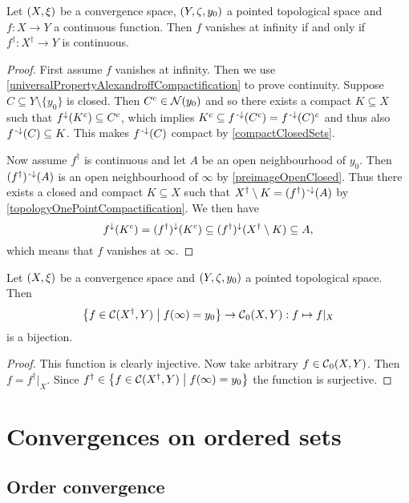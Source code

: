 \begin{proposition} \label{vanishesAtInfinityIffBasepointExtensionContinuous}
Let $\sSet{X,\xi}$ be a convergence space, $\sSet{Y,\zeta, y_0}$ a pointed topological space and $f:X\to Y$ a continuous function. Then $f$ vanishes at infinity \textup{if and only if} $f^\dagger: X^\dagger \to Y$ is continuous.
\end{proposition}
\begin{proof}
First assume $f$ vanishes at infinity. Then we use \ref{universalPropertyAlexandroffCompactification} to prove continuity. Suppose $C\subseteq Y\setminus\{y_0\}$ is closed. Then $C^c \in \operatorname{\mathcal{N}}(y_0)$ and so there exists a compact $K\subseteq X$ such that $f^\downarrow(K^c)\subseteq C^c$, which implies $K^c \subseteq f^{\text{\hspace{0.15em}-}\downarrow}(C^c) = f^{\text{\hspace{0.15em}-}\downarrow}(C)^c$ and thus also $f^{\text{\hspace{0.15em}-}\downarrow}(C)\subseteq K$. This makes $f^{\text{\hspace{0.15em}-}\downarrow}(C)$ compact by \ref{compactClosedSets}.

Now assume $f^\dagger$ is continuous and let $A$ be an open neighbourhood of $y_0$. Then $(f^\dagger)^{\text{\hspace{0.15em}-}\downarrow}(A)$ is an open neighbourhood of $\infty$ by \ref{preimageOpenClosed}. Thus there exists a closed and compact $K\subseteq X$ such that $X^\dagger\setminus K = (f^\dagger)^{\text{\hspace{0.15em}-}\downarrow}(A)$ by \ref{topologyOnePointCompactification}. We then have
\[ f^\downarrow(K^c) = (f^\dagger)^\downarrow(K^c) \subseteq (f^\dagger)^\downarrow(X^\dagger \setminus K) \subseteq A, \]
which means that $f$ vanishes at $\infty$.
\end{proof}
\begin{corollary} \label{functionVanishingAtInftyIffRestrictionOfContinuousBasepointPreservingFunction}
Let $\sSet{X,\xi}$ be a convergence space and $\sSet{Y,\zeta, y_0}$ a pointed topological space. Then
\[ \setbuilder{f\in \cont(X^\dagger, Y)}{f(\infty) = y_0} \to \cont_0(X,Y): f\mapsto f|_X \]
is a bijection.
\end{corollary}
\begin{proof}
This function is clearly injective. Now take arbitrary $f\in \operatorname{\mathcal{C}}_0(X,Y)$. Then $f = f^\dagger|_X$. Since $f^\dagger\in \setbuilder{f\in \cont(X^\dagger, Y)}{f(\infty) = y_0}$ the function is surjective.
\end{proof}



\section{Convergences on ordered sets}
\subsection{Order convergence}
